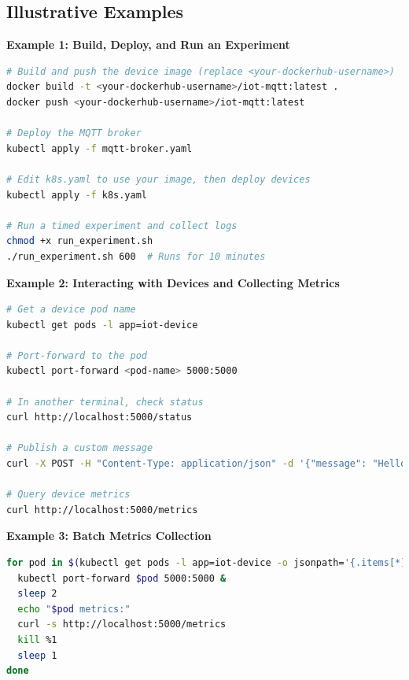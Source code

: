\documentclass[review]{elsarticle}
\begin{document}
\subsection{Illustrative Examples}
\textbf{Example 1: Build, Deploy, and Run an Experiment}
\begin{center}
\begin{lstlisting}[language=bash,caption={Build, push, and deploy the simulator, then run an experiment}]
# Build and push the device image (replace <your-dockerhub-username>)
docker build -t <your-dockerhub-username>/iot-mqtt:latest .
docker push <your-dockerhub-username>/iot-mqtt:latest

# Deploy the MQTT broker
kubectl apply -f mqtt-broker.yaml

# Edit k8s.yaml to use your image, then deploy devices
kubectl apply -f k8s.yaml

# Run a timed experiment and collect logs
chmod +x run_experiment.sh
./run_experiment.sh 600  # Runs for 10 minutes
\end{lstlisting}
\end{center}

\textbf{Example 2: Interacting with Devices and Collecting Metrics}
\begin{center}
\begin{lstlisting}[language=bash,caption={Check device status, publish messages, and collect metrics}]
# Get a device pod name
kubectl get pods -l app=iot-device

# Port-forward to the pod
kubectl port-forward <pod-name> 5000:5000

# In another terminal, check status
curl http://localhost:5000/status

# Publish a custom message
curl -X POST -H "Content-Type: application/json" -d '{"message": "Hello network!"}' http://localhost:5000/publish

# Query device metrics
curl http://localhost:5000/metrics
\end{lstlisting}
\end{center}

\textbf{Example 3: Batch Metrics Collection}
\begin{center}
\begin{lstlisting}[language=bash,caption={Automate metrics collection from all device pods}]
for pod in $(kubectl get pods -l app=iot-device -o jsonpath='{.items[*].metadata.name}'); do
  kubectl port-forward $pod 5000:5000 &
  sleep 2
  echo "$pod metrics:"
  curl -s http://localhost:5000/metrics
  kill %1
  sleep 1
done
\end{lstlisting}
\end{center}
\end{document}
